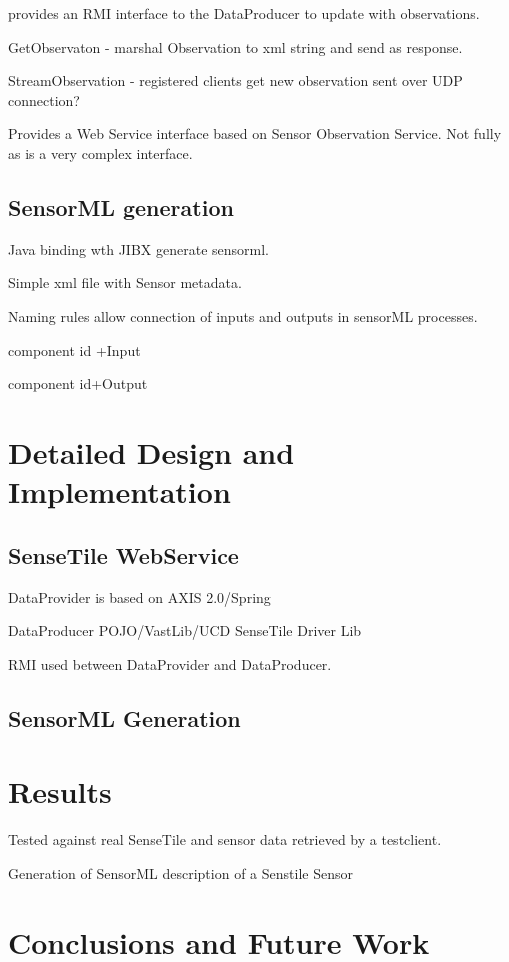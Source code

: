 \documentclass[]{final_report}
\begin{document}
provides an RMI interface to the DataProducer to update with observations. 


GetObservaton - marshal Observation to xml string and send as response.

StreamObservation -  registered clients get new observation sent over UDP connection?

Provides a Web Service interface  based on Sensor Observation Service. Not fully as is a very complex interface.

\newpage
\section{SensorML generation}

Java binding wth JIBX  generate sensorml.

Simple xml file with Sensor metadata.

Naming rules allow connection of inputs and outputs
in sensorML processes.

 component id +Input

 component id+Output

\chapter{ Detailed Design and Implementation}

\section{SenseTile WebService}

DataProvider is based on AXIS 2.0/Spring

DataProducer POJO/VastLib/UCD SenseTile Driver Lib

RMI used between DataProvider and DataProducer.

\section{SensorML Generation}

\chapter{Results}

Tested against real SenseTile and sensor data retrieved by a testclient.

Generation of SensorML description of a Senstile Sensor

\chapter{ Conclusions and Future Work}
\end{document}
